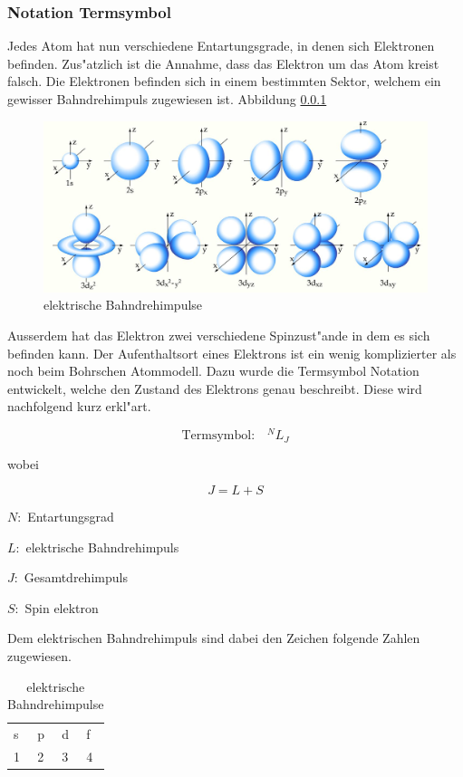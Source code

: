 \begin{refsection}
\subsubsection{Notation Termsymbol}
Jedes Atom hat nun verschiedene Entartungsgrade, in denen sich Elektronen befinden. Zus"atzlich ist die Annahme, dass das Elektron um das Atom kreist falsch. Die Elektronen befinden sich in einem bestimmten Sektor, welchem ein gewisser Bahndrehimpuls zugewiesen ist. 
Abbildung \ref{}
\begin{figure}
	\centering
	\includegraphics[width = 0.8\columnwidth]{../vortrag/pictures/orbitale.JPG}
	\caption{elektrische Bahndrehimpulse} %
	\label{atomuhr:bahndrehimpuls}
\end{figure}
Ausserdem hat das Elektron zwei verschiedene Spinzust"ande in dem es sich befinden kann. Der Aufenthaltsort eines Elektrons ist ein wenig komplizierter als noch beim Bohrschen Atommodell.
Dazu wurde die Termsymbol Notation entwickelt, welche den Zustand des Elektrons genau beschreibt. 
Diese wird nachfolgend kurz erkl"art.

\begin{equation}
	\text{Termsymbol:} \quad ^NL _J
\end{equation}

wobei

\begin{equation}
	J = L + S
\end{equation}

$N:$ Entartungsgrad

$L:$ elektrische Bahndrehimpuls

$J:$ Gesamtdrehimpuls

$S:$ Spin elektron

Dem elektrischen Bahndrehimpuls sind dabei den Zeichen folgende Zahlen zugewiesen.

\begin{table}
	\centering	
	\begin{tabular}{llll}
		s & p & d & f \\
		1 & 2 & 3 & 4 \\
	\end{tabular}
	\caption{elektrische Bahndrehimpulse}
	\label{atomuhr:drehimpulsnotation}
\end{table}


\end{refsection}
